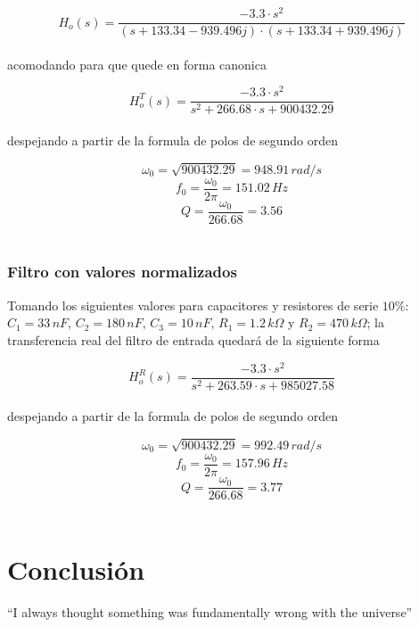 $$H_o(s)= \frac{-3.3 \cdot s^{2}}{(s +133.34 -939.496j) \cdot (s + 133.34 +939.496j)}$$ \\

acomodando para que quede en forma canonica

$$H_{o}^{T}(s)=  \frac{-3.3 \cdot s^{2}}{s^{2}+266.68\cdot s + 900432.29}$$ \\

despejando a partir de la formula de polos de segundo orden

$$\omega_{0}= \sqrt{900432.29} = 948.91 \, rad/s $$
$$f_{0}= \frac{\omega_{0}}{2\pi} = 151.02 \, Hz $$
$$ Q= \frac{\omega_{0}}{266.68} = 3.56 $$ \\

\subsubsection{Filtro con valores normalizados}

Tomando los siguientes valores para capacitores y resistores de serie $10\%$:
$C_{1} = 33 \, nF$, $C_{2} = 180 \, nF$, $C_{3} = 10 \, nF$, $R_{1} = 1.2 \, k\Omega$ y $R_{2} = 470 \, k\Omega$; la transferencia real del filtro de entrada quedará de la siguiente forma

$$H_{o}^{R}(s)=  \frac{-3.3 \cdot s^{2}}{s^{2}+263.59\cdot s + 985027.58}$$ \\

despejando a partir de la formula de polos de segundo orden

$$\omega_{0}= \sqrt{900432.29} = 992.49 \, rad/s $$
$$f_{0}= \frac{\omega_{0}}{2\pi} = 157.96 \, Hz $$
$$ Q= \frac{\omega_{0}}{266.68} = 3.77 $$ \\

\section{Conclusión}
``I always thought something was fundamentally wrong with the universe'' \citep{adams1995hitchhiker}




